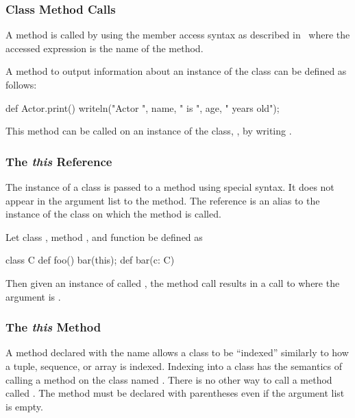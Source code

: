 \subsubsection{Class Method Calls}
\label{Class_Method_Calls}

A method is called by using the member access syntax as described
in~ where the accessed expression is
the name of the method.

\begin{example}
A method to output information about an instance of the 
class can be defined as follows:
\begin{chapel}
def Actor.print() {
  writeln("Actor ", name, " is ", age, " years old");
}
\end{chapel}
This method can be called on an instance of the 
class, , by writing .
\end{example}

\subsubsection{The {\em this} Reference}
\label{The_em_this_Reference}

The instance of a class is passed to a method using special syntax.
It does not appear in the argument list to the method.  The
reference  is an alias to the instance of the class on
which the method is called.

\begin{example}
Let class , method , and function  be
defined as
\begin{chapel}
class C {
  def foo() {
    bar(this);
  }
}
def bar(c: C) { }
\end{chapel}
Then given an instance of  called , the method
call  results in a call to  where the argument
is .
\end{example}

\subsubsection{The {\em this} Method}
\label{The_em_this_Method}

A method declared with the name  allows a class to be
``indexed'' similarly to how a tuple, sequence, or array is indexed.
Indexing into a class has the semantics of calling a method on the
class named .  There is no other way to call a method
called .  The  method must be declared with
parentheses even if the argument list is empty.

